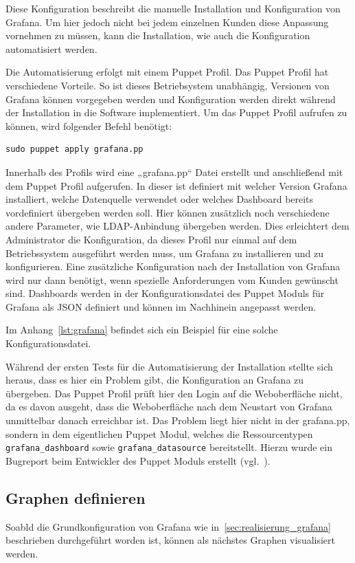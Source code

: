 Diese Konfiguration beschreibt die manuelle Installation und Konfiguration von
Grafana. Um hier jedoch nicht bei jedem einzelnen Kunden diese Anpassung
vornehmen zu müssen, kann die Installation, wie auch die Konfiguration
automatisiert werden.

Die Automatisierung erfolgt mit einem Puppet Profil. Das Puppet Profil hat
verschiedene Vorteile. So ist dieses Betriebsystem unabhängig, Versionen von
Grafana können vorgegeben werden und Konfiguration werden direkt während der
Installation in die Software implementiert. Um das Puppet Profil aufrufen zu
können, wird folgender Befehl benötigt:

\begin{verbatim}
sudo puppet apply grafana.pp
\end{verbatim}

Innerhalb des Profils wird eine „grafana.pp“ Datei erstellt und anschließend
mit dem Puppet Profil aufgerufen. In dieser ist definiert mit welcher Version
Grafana installiert, welche Datenquelle verwendet oder welches Dashboard
bereits vordefiniert übergeben werden soll. Hier können zusätzlich noch
verschiedene andere Parameter, wie LDAP\hyp{}Anbindung übergeben werden. Dies
erleichtert dem Administrator die Konfiguration, da dieses Profil nur einmal
auf dem Betriebssystem ausgeführt werden muss, um Grafana zu installieren und
zu konfigurieren. Eine zusätzliche Konfiguration nach der Installation von
Grafana wird nur dann benötigt, wenn spezielle Anforderungen vom Kunden
gewünscht sind. Dashboards werden in der Konfigurationsdatei des Puppet Moduls
für Grafana als \gls{JSON} definiert und können im Nachhinein angepasst werden.

Im Anhang~\ref{lst:grafana} befindet sich ein Beispiel für eine solche
Konfigurationsdatei.

Während der ersten Tests für die Automatisierung der Installation stellte sich
heraus, dass es hier ein Problem gibt, die Konfiguration an Grafana zu
übergeben. Das Puppet Profil prüft hier den Login auf die Weboberfläche nicht,
da es davon ausgeht, dass die Weboberfläche nach dem Neustart von Grafana
unmittelbar danach erreichbar ist. Das Problem liegt hier nicht in der
grafana.pp, sondern in dem eigentlichen Puppet Modul, welches die
Ressourcentypen \texttt{grafana\_dashboard} sowie \texttt{grafana\_datasource}
bereitstellt. Hierzu wurde ein Bugreport beim Entwickler des Puppet Moduls
erstellt (vgl.~\cite{grafana-issue}).
\mr%

\subsection{Graphen definieren}
\label{subsec:graphen-definieren}
Soabld die Grundkonfiguration von Grafana wie in~\ref{sec:realisierung_grafana}
beschrieben durchgeführt worden ist, können als nächstes Graphen visualisiert
werden.
\mr%

